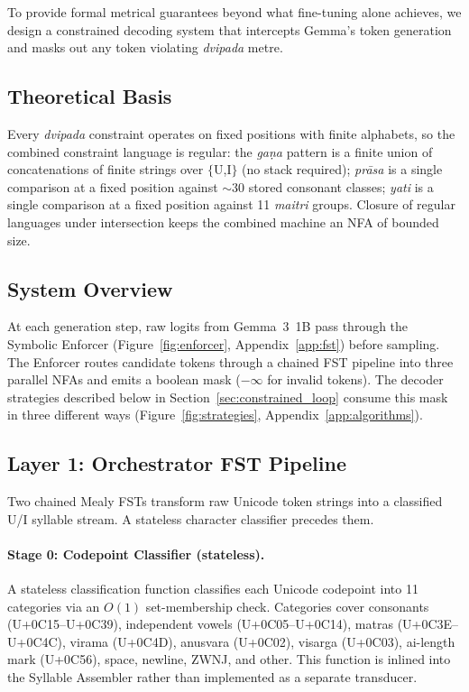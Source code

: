 \documentclass[11pt]{article}
\begin{document}
To provide formal metrical guarantees beyond what fine-tuning alone achieves,
we design a constrained decoding system that intercepts Gemma's token
generation and masks out any token violating \textit{dvipada} metre.

\subsection{Theoretical Basis}

Every \textit{dvipada} constraint operates on fixed positions with finite
alphabets, so the combined constraint language is regular: the
\textit{ga\d{n}a} pattern is a finite union of concatenations of finite
strings over $\{$U,I$\}$ (no stack required); \textit{pr\={a}sa} is a
single comparison at a fixed position against $\sim$30 stored consonant
classes; \textit{yati} is a single comparison at a fixed position against
11 \textit{maitri} groups. Closure of regular languages under intersection
keeps the combined machine an NFA of bounded size.


\subsection{System Overview}

At each generation step, raw logits from Gemma~3~1B pass through the
Symbolic Enforcer (Figure~\ref{fig:enforcer}, Appendix~\ref{app:fst})
before sampling. The Enforcer routes candidate tokens through a chained
FST pipeline into three parallel NFAs and emits a boolean mask
($-\infty$ for invalid tokens). The decoder strategies described below
in Section~\ref{sec:constrained_loop} consume this mask in three
different ways (Figure~\ref{fig:strategies}, Appendix~\ref{app:algorithms}).

\subsection{Layer 1: Orchestrator FST Pipeline}
\label{sec:fst}

Two chained Mealy FSTs transform raw Unicode token strings into a
classified U/I syllable stream. A stateless character classifier precedes them.

\paragraph{Stage 0: Codepoint Classifier (stateless).}
A stateless classification function classifies each Unicode codepoint into 11 categories
via an $O(1)$ set-membership check. Categories cover consonants
(U+0C15--U+0C39), independent vowels (U+0C05--U+0C14), matras
(U+0C3E--U+0C4C), virama (U+0C4D), anusvara (U+0C02), visarga (U+0C03),
ai-length mark (U+0C56), space, newline, ZWNJ, and other. This function is inlined into the Syllable Assembler rather than implemented as a separate transducer.
\end{document}
